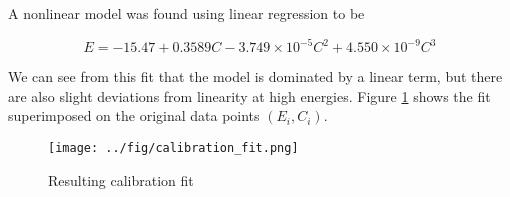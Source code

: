 A nonlinear model was found using linear regression to be

\begin{equation}
E = -15.47 + 0.3589C - 3.749\times 10^{-5}C^2 + 4.550\times10^{-9}C^3
\end{equation}

We can see from this fit that the model is dominated by a linear term, but
there are also slight deviations from linearity at high energies. Figure
\ref{fig:fit} shows the fit superimposed on the original data points $(E_i, C_i)$.

\begin{figure}[H]
\label{fig:fit}
\begin{center}
\texttt{[image: ../fig/calibration\_fit.png]}
\caption{Resulting calibration fit}
\end{center}
\end{figure}
